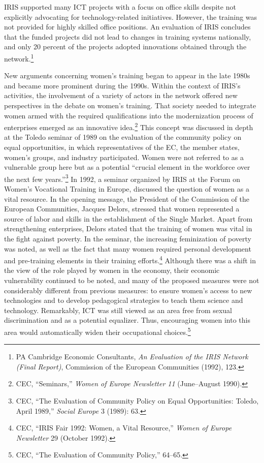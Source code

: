 \documentclass{tufte-handout}
\begin{document}
IRIS supported many ICT projects with a focus on office skills despite
not explicitly advocating for technology-related initiatives. However,
the training was not provided for highly skilled office positions. An
evaluation of IRIS concludes that the funded projects did not lead to
changes in training systems nationally, and only 20 percent of the
projects adopted innovations obtained through the network.\footnote{PA
  Cambridge Economic Consultants, \emph{An Evaluation of the IRIS
  Network (Final Report)}, Commission of the European Communities
  (1992), 123.}

New arguments concerning women's training began to appear in the late
1980s and became more prominent during the 1990s. Within the context of
IRIS's activities, the involvement of a variety of actors in the network
offered new perspectives in the debate on women's training. That society
needed to integrate women armed with the required qualifications into
the modernization process of enterprises emerged as an innovative
idea.\footnote{CEC, ``Seminars,'' \emph{Women of Europe Newsletter 11}
  (June--August 1990).} This concept was discussed in depth at the
Toledo seminar of 1989 on the evaluation of the community policy on
equal opportunities, in which representatives of the EC, the member
states, women's groups, and industry participated. Women were not
referred to as a vulnerable group here but as a potential ``crucial
element in the workforce over the next few years.''\footnote{CEC, ``The
  Evaluation of Community Policy on Equal Opportunities: Toledo, April
  1989,'' \emph{Social Europe} 3 (1989): 63.} In 1992, a seminar
organized by IRIS at the Forum on Women's Vocational Training in Europe,
discussed the question of women as a vital resource. In the opening
message, the President of the Commission of the European Communities,
Jacques Delors, stressed that women represented a source of labor and
skills in the establishment of the Single Market. Apart from
strengthening enterprises, Delors stated that the training of women was
vital in the fight against poverty. In the seminar, the increasing
feminization of poverty was noted, as well as the fact that many women
required personal development and pre-training elements in their
training efforts.\footnote{CEC, ``IRIS Fair 1992: Women, a Vital
  Resource,'' \emph{Women of Europe Newsletter} 29 (October 1992).}
Although there was a shift in the view of the role played by women in
the economy, their economic vulnerability continued to be noted, and
many of the proposed measures were not considerably different from
previous measures: to ensure women's access to new technologies and to
develop pedagogical strategies to teach them science and technology.
Remarkably, ICT was still viewed as an area free from sexual
discrimination and as a potential equalizer. Thus, encouraging women
into this area would automatically widen their occupational
choices.\footnote{CEC, ``The Evaluation of Community Policy,'' 64--65.}
\end{document}
